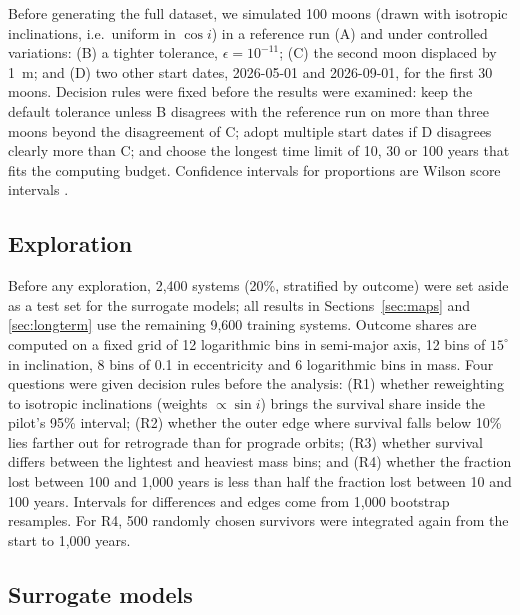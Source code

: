 \documentclass[twocolumn]{aastex631}
\begin{document}
Before generating the full dataset, we simulated 100 moons (drawn with isotropic inclinations,
i.e.\ uniform in $\cos i$) in a reference run (A) and under controlled variations: (B) a tighter
tolerance,
$\epsilon = 10^{-11}$; (C) the second moon displaced by 1~m; and (D) two other start dates,
2026-05-01 and 2026-09-01, for the first 30 moons. Decision rules were fixed before the results
were examined: keep the default tolerance unless B disagrees with the reference run on more than
three moons beyond the disagreement of C; adopt multiple start dates if D disagrees clearly more
than C; and choose the longest time limit of 10, 30 or 100 years that fits the computing budget.
Confidence intervals for proportions are Wilson score intervals \citep{Wilson1927}.

\subsection{Exploration} \label{sec:exploration}

Before any exploration, 2,400 systems (20\%, stratified by outcome) were set aside as a test set
for the surrogate models; all results in Sections~\ref{sec:maps} and \ref{sec:longterm} use the
remaining 9,600 training systems. Outcome shares are computed on a fixed grid of 12 logarithmic
bins in semi-major axis, 12 bins of $15^\circ$ in inclination, 8 bins of 0.1 in eccentricity and
6 logarithmic bins in mass. Four questions were given decision rules before the analysis:
(R1) whether reweighting to isotropic inclinations (weights $\propto \sin i$) brings the survival
share inside the pilot's 95\% interval; (R2) whether the outer edge where survival falls below
10\% lies farther out for retrograde than for prograde orbits; (R3) whether survival differs
between the lightest and heaviest mass bins; and (R4) whether the fraction lost between 100 and
1,000 years is less than half the fraction lost between 10 and 100 years. Intervals for
differences and edges come from 1,000 bootstrap resamples. For R4, 500 randomly chosen survivors
were integrated again from the start to 1,000 years.

\subsection{Surrogate models}
\end{document}
